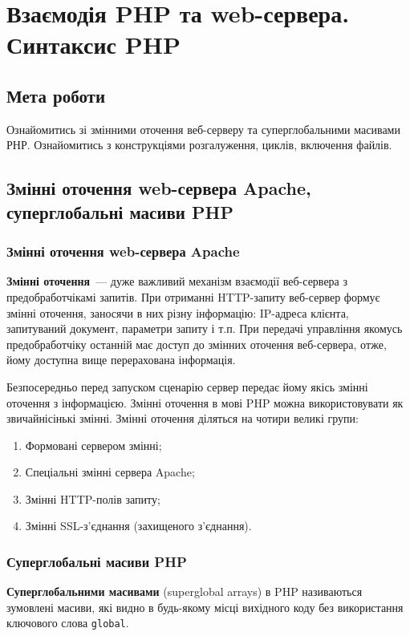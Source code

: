 \chapter{Взаємодія PHP та web-сервера. Синтаксис PHP}
\nopagebreak[4]
\section*{Мета роботи}
Ознайомитись зі змінними оточення веб-серверу та суперглобальними масивами РНР. Ознайомитись з конструкціями розгалуження, циклів, включення файлів.
\section{Змінні оточення web-сервера Apache, суперглобальні масиви PHP}
\nopagebreak[4]

\subsection*{Змінні оточення web-сервера Apache}
\textbf{Змінні оточення}~--- дуже важливий механізм взаємодії веб-сервера з предобработчікамі запитів. При отриманні HTTP-запиту веб-сервер формує змінні оточення, заносячи в них різну інформацію: IP-адреса клієнта, запитуваний документ, параметри запиту і т.п. При передачі управління якомусь предобработчіку останній має доступ до змінних оточення веб-сервера, отже, йому доступна вище перерахована інформація.

Безпосередньо перед запуском сценарію сервер передає йому якісь змінні оточення з інформацією. Змінні оточення в мові PHP можна використовувати як звичайнісінькі змінні. Змінні оточення діляться на чотири великі групи:
\begin{enumerate}
\item Формовані сервером змінні;
\item Спеціальні змінні сервера Apache;
\item Змінні HTTP-полів запиту;
\item Змінні SSL-з'єднання (захищеного з'єднання).
\end{enumerate}

\subsection*{Суперглобальні масиви PHP}
\textbf{Суперглобальними масивами} (superglobal arrays) в PHP називаються зумовлені масиви, які видно в будь-якому місці вихідного коду без використання ключового слова \verb'global'.


